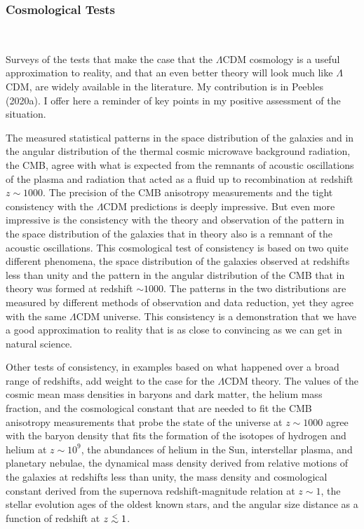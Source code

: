 \documentclass[fleqn,usenatbib]{mnras}
\def\lap{\lower.5ex\hbox{$\; \buildrel < \over \sim \;$}}
\begin{document}
\subsubsection{Cosmological Tests}~\label{sec:tests}

Surveys of the tests that make the case that the $\Lambda$CDM cosmology is a useful approximation to reality, and that an even better theory will look much like $\Lambda$CDM, are widely available in the literature. My contribution is in Peebles (2020a). I offer here a reminder of key points in my positive assessment of the situation. 

The measured statistical patterns in the space distribution of the galaxies and in the angular distribution of the thermal cosmic microwave background radiation, the CMB, agree with what is expected from the remnants of acoustic oscillations of the plasma and radiation that acted as a fluid up to recombination at redshift $z\sim 1000$.  The precision of the CMB anisotropy measurements and the tight consistency with the $\Lambda$CDM predictions is deeply impressive. But even more impressive is the consistency with the theory and observation of the pattern in the space distribution of the galaxies that in theory also is a remnant of the acoustic oscillations. This cosmological test of consistency is based on two quite different phenomena, the space distribution of the galaxies observed at redshifts less than unity and the pattern in the angular distribution of the CMB that in theory was formed at redshift $\sim 1000$. The patterns in the two distributions are measured by different methods of observation and data reduction, yet they agree with the same $\Lambda$CDM universe. This consistency is a demonstration that we have a good approximation to reality that is as close to convincing as we can get in natural science.

Other tests of consistency, in examples based on what happened over a broad range of redshifts, add weight to the case for the $\Lambda$CDM theory. The values of the cosmic mean mass densities in baryons and dark matter, the helium mass fraction, and the cosmological constant that are needed to fit the CMB anisotropy measurements that probe the state of the universe at $z\sim 1000$ agree with the baryon density that fits the formation of the isotopes of hydrogen and helium at $z\sim 10^9$, the abundances of helium in the Sun, interstellar plasma, and planetary nebulae,  the dynamical mass density derived from relative motions of the galaxies at redshifts less than unity, the mass density and cosmological constant derived from the supernova redshift-magnitude relation at $z\sim 1$, the stellar evolution ages of the oldest known stars, and the angular size distance as a function of redshift at $z\lap 1$. 
\end{document}
